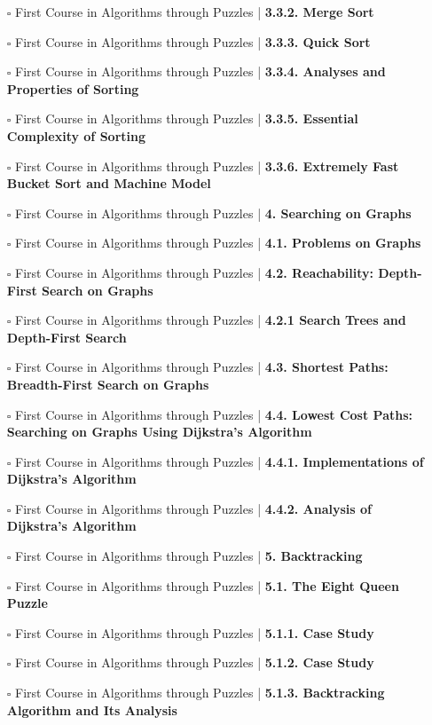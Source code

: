 \documentclass[a4, landscape, 12pt]{article}
\newcommand{\checkbox}{$\square$}%
\begin{document}
\begin{itemize}
{}
\item [\checkbox]  First Course in Algorithms through Puzzles | \textbf{ 3.3.2. Merge Sort
}
\item [\checkbox]  First Course in Algorithms through Puzzles | \textbf{ 3.3.3. Quick Sort
}
\item [\checkbox]  First Course in Algorithms through Puzzles | \textbf{ 3.3.4. Analyses and Properties of Sorting
}
\item [\checkbox]  First Course in Algorithms through Puzzles | \textbf{ 3.3.5. Essential Complexity of Sorting
}
\item [\checkbox]  First Course in Algorithms through Puzzles | \textbf{ 3.3.6. Extremely Fast Bucket Sort and Machine Model
}
\item [\checkbox]  First Course in Algorithms through Puzzles | \textbf{ 4. Searching on Graphs
}
\item [\checkbox]  First Course in Algorithms through Puzzles | \textbf{ 4.1. Problems on Graphs
}
\item [\checkbox]  First Course in Algorithms through Puzzles | \textbf{ 4.2. Reachability: Depth-First Search on Graphs
}
\item [\checkbox]  First Course in Algorithms through Puzzles | \textbf{ 4.2.1 Search Trees and Depth-First Search
}
\item [\checkbox]  First Course in Algorithms through Puzzles | \textbf{ 4.3. Shortest Paths: Breadth-First Search on Graphs
}
\item [\checkbox]  First Course in Algorithms through Puzzles | \textbf{ 4.4. Lowest Cost Paths: Searching on Graphs Using Dijkstra’s Algorithm
}
\item [\checkbox]  First Course in Algorithms through Puzzles | \textbf{ 4.4.1. Implementations of Dijkstra’s Algorithm
}
\item [\checkbox]  First Course in Algorithms through Puzzles | \textbf{ 4.4.2. Analysis of Dijkstra’s Algorithm
}
\item [\checkbox]  First Course in Algorithms through Puzzles | \textbf{ 5. Backtracking
}
\item [\checkbox]  First Course in Algorithms through Puzzles | \textbf{ 5.1. The Eight Queen Puzzle
}
\item [\checkbox]  First Course in Algorithms through Puzzles | \textbf{ 5.1.1. Case Study
}
\item [\checkbox]  First Course in Algorithms through Puzzles | \textbf{ 5.1.2. Case Study
}
\item [\checkbox]  First Course in Algorithms through Puzzles | \textbf{ 5.1.3. Backtracking Algorithm and Its Analysis
}
\end{itemize}
\end{document}

